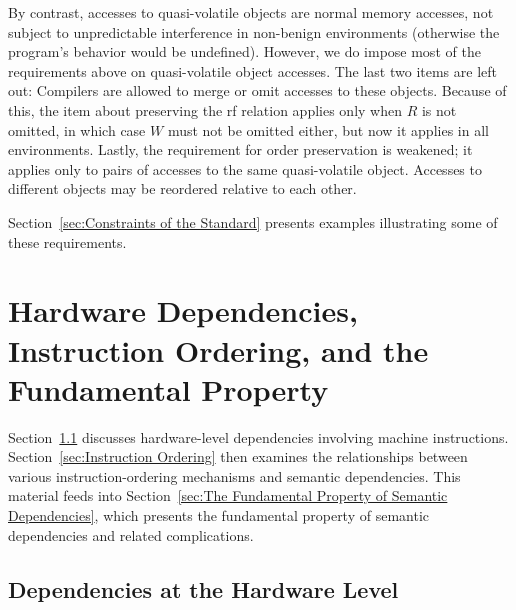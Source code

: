 \documentclass[10]{article}
\begin{document}
By contrast, accesses to quasi-volatile objects are normal memory
accesses, not subject to unpredictable interference in non-benign
environments (otherwise the program's behavior would be undefined).
However, we do impose most of the requirements above on quasi-volatile
object accesses.
The last two items are left out: Compilers are allowed to merge or
omit accesses to these objects.
Because of this, the item about preserving the rf relation
applies only when $R$ is not omitted, in which case $W$ must not
be omitted either, but now it applies in all environments.
Lastly, the requirement for order preservation is weakened; it applies
only to pairs of accesses to the same quasi-volatile object.
Accesses to different objects may be reordered relative to each other.

Section~\ref{sec:Constraints of the Standard}
presents examples illustrating some of these requirements.

\section{Hardware Dependencies, Instruction Ordering, and the
Fundamental Property}
\label{sec:Hardware Dependencies, Instruction Ordering, and the
Fundamental Property}

Section~\ref{sec:Dependencies at the Hardware Level}
discusses hardware-level dependencies involving machine instructions.
Section~\ref{sec:Instruction Ordering}
then examines the relationships between various instruction-ordering
mechanisms and semantic dependencies.
This material feeds into
Section~\ref{sec:The Fundamental Property of Semantic Dependencies},
which presents the fundamental property of semantic dependencies
and related complications.

\subsection{Dependencies at the Hardware Level}
\label{sec:Dependencies at the Hardware Level}
\end{document}
